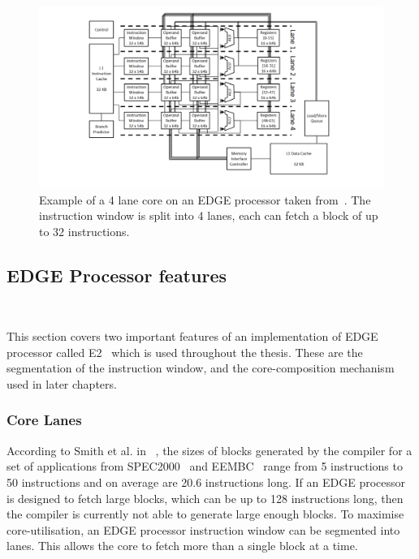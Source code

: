  \begin{figure}[t]
 \center
 \includegraphics[width=1\textwidth]{background/graphics/edge_lanes.pdf}
 \vspace{-4em}
 \caption{Example of a 4 lane core on an EDGE processor taken from~\cite{putnam2010e2}. The instruction window is split into 4 lanes, each can fetch a block of up to 32 instructions.}\label{fig:e2segment}
\vspace{-1em}
 \end{figure}

\subsection{EDGE Processor features}~\label{sec:edge_arch}

This section covers two important features of an implementation of EDGE processor called E2~\cite{putnam2010e2} which is used throughout the thesis.
These are the segmentation of the instruction window, and the core-composition mechanism used in later chapters.

\subsubsection{Core Lanes} 

According to Smith et al. in ~\cite{smith2006edge}, the sizes of blocks generated by the compiler for a set of applications from SPEC2000~\cite{spec2000} and EEMBC~\cite{eembc} range from 5 instructions to 50 instructions and on average are 20.6 instructions long.
If an EDGE processor is designed to fetch large blocks, which can be up to 128 instructions long, then the compiler is currently not able to generate large enough blocks.
To maximise core-utilisation, an EDGE processor instruction window can be segmented into lanes.
This allows the core to fetch more than a single block at a time.

